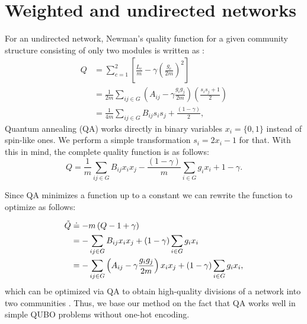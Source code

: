 \documentclass[pdflatex,sn-mathphys-num]{sn-jnl}%
\begin{document}
\section{Weighted and undirected networks} \label{app:A}
For an undirected network, Newman's quality function for a given community structure consisting of only two modules is written as \cite{Wierzbinski2023}:
\begin{equation} \label{eq_A:ising}
    \begin{split}
        Q & = \sum_{c=1}^{2}\left[ \frac{L_c}{m} - \gamma \left(\frac{g_c}{2m}\right)^2\right] \\
          & = \frac{1}{2m} \sum_{ij\in G}\left( A_{ij} - \gamma \frac{g_i g_j}{2m} \right) \left(\frac{s_i s_j + 1}{2}\right)\\
          & = \frac{1}{4m} \sum_{ij\in G} B_{ij} s_i s_j + \frac{(1-\gamma)}{2},
    \end{split}
\end{equation} Quantum annealing (QA) works directly in binary variables $x_i=\{0,1\}$ instead of spin-like ones. We perform a simple transformation $s_i = 2x_i - 1$ for that. With this in mind, the complete quality function is as follows:
\begin{equation} \label{eq_A:QUBO}
    Q = \frac{1}{m}\sum_{ij\in G} B_{ij} x_i x_j - \frac{(1-\gamma)}{m}\sum_{i\in G} g_{i} x_i + 1-\gamma.
\end{equation}

Since QA minimizes a function up to a constant we can rewrite the function to optimize as follows:

\begin{equation} \label{eq_A:QUBO_optim}
    \begin{split}
        \Tilde{Q} & \doteq - m \left(Q - 1 + \gamma \right) \\
                  & = -\sum_{ij\in G} B_{ij} x_i x_j + (1-\gamma)\sum_{i\in G} g_{i} x_i \\
                  & = -\sum_{ij\in G} \left( A_{ij} - \gamma \frac{g_i g_j}{2m} \right) x_i x_j + (1-\gamma)\sum_{i\in G} g_{i} x_i,
    \end{split}
\end{equation} which can be optimized via QA to obtain high-quality divisions of a network into two communities \cite{Ushijima-Mwesigwa2017,Negre2020,Nembrini2022,Wierzbinski2023}. Thus, we base our method on the fact that QA works well in simple QUBO problems without one-hot encoding.
\end{document}
